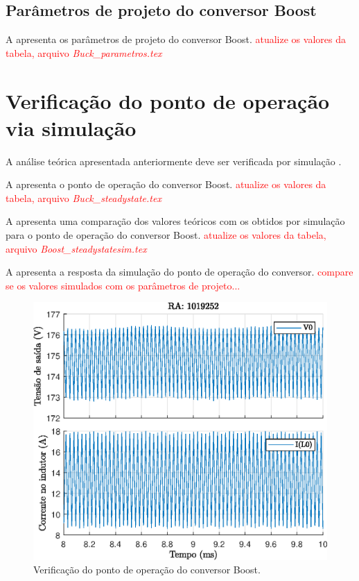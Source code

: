 \subsection{Parâmetros de projeto do conversor Boost}


A  apresenta os parâmetros de projeto do conversor Boost.
\textcolor{red}{atualize os valores da tabela, arquivo \emph{Buck\_parametros.tex} }





\section{Verificação do ponto de operação via simulação}

A análise teórica apresentada anteriormente deve ser verificada por simulação \cite{noauthor_psim_nodate}.

A  apresenta o ponto de operação do conversor Boost.
\textcolor{red}{atualize os valores da tabela, arquivo \emph{Buck\_steadystate.tex} }




A  apresenta uma comparação dos valores teóricos com os obtidos por simulação para o ponto de operação do conversor Boost.
\textcolor{red}{atualize os valores da tabela, arquivo \emph{Boost\_steadystatesim.tex} }



A  apresenta a resposta da simulação do ponto de operação do conversor. \textcolor{red}{compare se os valores simulados com os parâmetros de projeto...}

\begin{figure}[!ht]
	\centering
	\includegraphics[width=0.9\linewidth]{Figs/Boost}
	\caption{Verificação do ponto de operação do conversor Boost.}
	\label{fig:boost-steadystate}
\end{figure}

